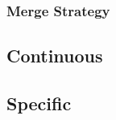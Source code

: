 \subsubsection*{Merge Strategy}


\newpage

\subsection{Continuous}
\label{subsec:continous_idrid}


\newpage

\subsection{Specific}
\label{subsec:specific_combination_idrid}

\newpage

